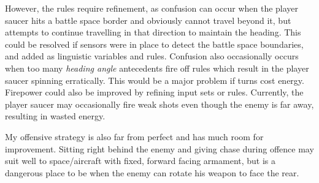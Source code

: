However, the rules require refinement, as confusion can occur when the player saucer hits a battle space border and obviously cannot travel beyond it, but attempts to continue travelling in that direction to maintain the heading. This could be resolved if sensors were in place to detect the battle space boundaries, and added as linguistic variables and rules. Confusion also occasionally occurs when too many \emph{heading angle} antecedents fire off rules which result in the player saucer spinning erratically. This would be a major problem if turns cost energy. Firepower could also be improved by refining input sets or rules. Currently, the player saucer may occasionally fire weak shots even though the enemy is far away, resulting in wasted energy.

My offensive strategy is also far from perfect and has much room for improvement. Sitting right behind the enemy and giving chase during offence may suit well to space/aircraft with fixed, forward facing armament, but is a dangerous place to be when the enemy can rotate his weapon to face the rear.